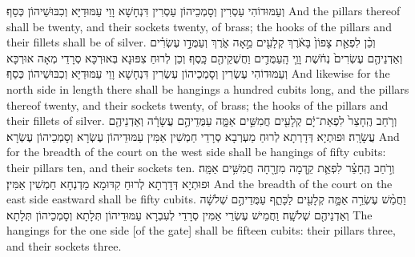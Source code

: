 {וְעַמּוּדוֹהִי עַסְרִין וְסָמְכֵיהוֹן עַסְרִין דִּנְחָשָׁא וָוֵי עַמּוּדַיָּא וְכִבּוּשֵׁיהוֹן כְּסַף׃}
{And the pillars thereof shall be twenty, and their sockets twenty, of brass; the hooks of the pillars and their fillets shall be of silver.}{}
{וְכֵ֨ן לִפְאַ֤ת צָפוֹן֙ בָּאֹ֔רֶךְ קְלָעִ֖ים מֵ֣אָה אֹ֑רֶךְ וְעַמֻּדָ֣ו עֶשְׂרִ֗ים וְאַדְנֵיהֶ֤ם עֶשְׂרִים֙ נְחֹ֔שֶׁת וָוֵ֧י הָֽעַמֻּדִ֛ים וַחֲשֻׁקֵיהֶ֖ם כָּֽסֶף׃}
{וְכֵן לְרוּחַ צִפּוּנָא בְּאוּרְכָּא סְרָדֵי מְאָה אוּרְכָּא וְעַמּוּדוֹהִי עֶשְׂרִין וְסָמְכֵיהוֹן עְשְׂרִין דִּנְחָשָׁא וָוֵי עַמּוּדַיָּא וְכִבּוּשֵׁיהוֹן כְּסַף׃}
{And likewise for the north side in length there shall be hangings a hundred cubits long, and the pillars thereof twenty, and their sockets twenty, of brass; the hooks of the pillars and their fillets of silver.}{}
{וְרֹ֤חַב הֶֽחָצֵר֙ לִפְאַת־יָ֔ם קְלָעִ֖ים חֲמִשִּׁ֣ים אַמָּ֑ה עַמֻּדֵיהֶ֣ם עֲשָׂרָ֔ה וְאַדְנֵיהֶ֖ם עֲשָׂרָֽה׃}
{וּפוּתְיָא דְּדָרְתָא לְרוּחַ מַעְרְבָא סְרָדֵי חַמְשִׁין אַמִּין עַמּוּדֵיהוֹן עֶשְׂרָא וְסָמְכֵיהוֹן עֶשְׂרָא׃}
{And for the breadth of the court on the west side shall be hangings of fifty cubits: their pillars ten, and their sockets ten.}{}
{וְרֹ֣חַב הֶֽחָצֵ֗ר לִפְאַ֛ת קֵ֥דְמָה מִזְרָ֖חָה חֲמִשִּׁ֥ים אַמָּֽה׃
}
{וּפוּתְיָא דְּדָרְתָא לְרוּחַ קִדּוּמָא מַדְנְחָא חַמְשִׁין אַמִּין׃}
{And the breadth of the court on the east side eastward shall be fifty cubits.}{}
{וַחֲמֵ֨שׁ עֶשְׂרֵ֥ה אַמָּ֛ה קְלָעִ֖ים לַכָּתֵ֑ף עַמֻּדֵיהֶ֣ם שְׁלֹשָׁ֔ה וְאַדְנֵיהֶ֖ם שְׁלֹשָֽׁה׃
}
{וַחֲמֵישׁ עֶשְׂרֵי אַמִּין סְרָדֵי לְעִבְרָא עַמּוּדֵיהוֹן תְּלָתָא וְסָמְכֵיהוֹן תְּלָתָא׃}
{The hangings for the one side [of the gate] shall be fifteen cubits: their pillars three, and their sockets three.}{}
